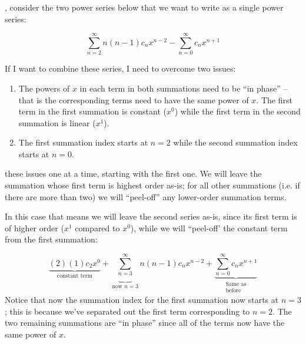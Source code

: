 , consider the two power series below that we want to write as a single power series:

\begin{equation*}
\sum\limits_{n=2}^{\infty} n(n-1)c_n x^{n-2} - \sum\limits_{n=0}^{\infty} c_n x^{n+1}
\end{equation*}

\noindent If I want to combine these series, I need to overcome two issues:
\begin{enumerate}

\item The powers of $x$ in each term in both summations need to be ``in phase'' -- that is the corresponding terms need to have the same power of $x$.  The first term in the first summation is constant ($x^0$) while the first term in the second summation is linear ($x^1$). 


\item The first summation index starts at $n=2$ while the second summation index starts at $n=0$.

\end{enumerate}


 these issues one at a time, starting with the first one.  We will leave the summation whose first term is highest order as-is; for all other summations (i.e. if there are more than two) we will ``peel-off'' any lower-order summation terms.

In this case that means we will leave the second series as-is, since its first term is of higher order ($x^1$ compared to $x^0$), while we will ``peel-off' the constant term from the first summation:

$$\underbrace{(2)(1)c_2x^0}_{\text{constant term}} + \underbrace{\sum\limits_{n=3}^{\infty}}_{\text{now }n=3} n(n-1)c_nx^{n-2} + \underbrace{\sum\limits_{n=0}^{\infty}c_nx^{n+1}}_{\substack{\text{Same as}\\ \text{before}}}$$
Notice that now the summation index for the first summation now starts at $n=3$; this is because we've separated out the first term corresponding to $n=2$.  The two remaining summations are ``in phase'' since all of the terms now have the same power of $x$.

